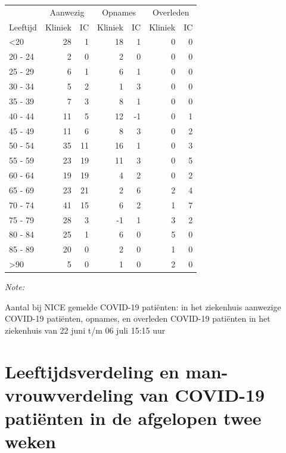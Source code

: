 \documentclass[
  english,
  man,floatsintext]{apa6}
\begin{document}
\begin{table}
\centering\begingroup\fontsize{10}{12}\selectfont

\begin{threeparttable}
\begin{tabular}{lrrrrrr}
\toprule
\multicolumn{1}{c}{ } & \multicolumn{2}{c}{Aanwezig} & \multicolumn{2}{c}{Opnames} & \multicolumn{2}{c}{Overleden} \\
\cmidrule(l{3pt}r{3pt}){2-3} \cmidrule(l{3pt}r{3pt}){4-5} \cmidrule(l{3pt}r{3pt}){6-7}
Leeftijd & Kliniek & IC & Kliniek & IC & Kliniek & IC\\
\midrule
<20 & 28 & 1 & 18 & 1 & 0 & 0\\
20 - 24 & 2 & 0 & 2 & 0 & 0 & 0\\
25 - 29 & 6 & 1 & 6 & 1 & 0 & 0\\
30 - 34 & 5 & 2 & 1 & 3 & 0 & 0\\
35 - 39 & 7 & 3 & 8 & 1 & 0 & 0\\
40 - 44 & 11 & 5 & 12 & -1 & 0 & 1\\
45 - 49 & 11 & 6 & 8 & 3 & 0 & 2\\
50 - 54 & 35 & 11 & 16 & 1 & 0 & 3\\
55 - 59 & 23 & 19 & 11 & 3 & 0 & 5\\
60 - 64 & 19 & 19 & 4 & 2 & 0 & 2\\
65 - 69 & 23 & 21 & 2 & 6 & 2 & 4\\
70 - 74 & 41 & 15 & 6 & 2 & 1 & 7\\
75 - 79 & 28 & 3 & -1 & 1 & 3 & 2\\
80 - 84 & 25 & 1 & 6 & 0 & 5 & 0\\
85 - 89 & 20 & 0 & 2 & 0 & 1 & 0\\
>90 & 5 & 0 & 1 & 0 & 2 & 0\\
\bottomrule
\end{tabular}
\begin{tablenotes}
\item \textit{Note: } 
\item Aantal bij NICE gemelde COVID-19 patiënten: in het ziekenhuis aanwezige COVID-19 patiënten, opnames, en overleden COVID-19 patiënten in het ziekenhuis van 22 juni t/m 06 juli 15:15 uur
\end{tablenotes}
\end{threeparttable}
\endgroup{}
\end{table}

\newpage

\hypertarget{leeftijdsverdeling-en-man-vrouwverdeling-van-covid-19-patiuxebnten-in-de-afgelopen-twee-weken}{%
\section{Leeftijdsverdeling en man-vrouwverdeling van COVID-19 patiënten in de afgelopen twee weken}\label{leeftijdsverdeling-en-man-vrouwverdeling-van-covid-19-patiuxebnten-in-de-afgelopen-twee-weken}}
\end{document}
